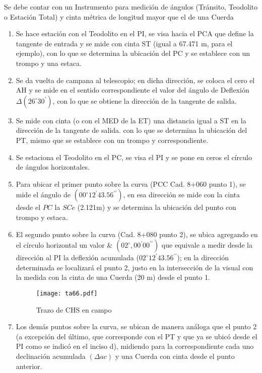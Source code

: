 Se debe contar con un Instrumento para medición de ángulos (Tránsito, Teodolito o Estación Total) y cinta métrica de longitud mayor que el de una Cuerda
\begin{enumerate}
    \item Se hace estación con el Teodolito en el PI, se visa hacia el PCA que define la tangente de entrada y se mide con cinta ST (igual a 67.471 m, para el ejemplo), con lo que se determina la ubicación del PC y se establece con un trompo y una estaca.
    \item Se da vuelta de campana al telescopio; en dicha dirección, se coloca el cero el AH y se mide en el sentido correspondiente el valor del ángulo de Deflexión $\Delta(26^{\circ} 30^{\prime})$, con lo que se obtiene la dirección de la tangente de salida.
    \item Se mide con cinta (o con el MED de la ET) una distancia igual a ST en la dirección de la tangente de salida. con lo que se determina la ubicación del PT, mismo que se establece con un trompo y correspondiente. 
    \item Se estaciona el Teodolito en el PC, se visa el PI y se pone en ceros el círculo de ángulos horizontales.
    \item Para ubicar el primer punto sobre la curva (PCC Cad. 8+060 punto 1), se mide el ángulo de $(00^{\circ} 12^{\prime} 43.56^{\prime\prime})$, en esa dirección se mide con la cinta desde el $PC$ la $SCe$ (2.121m) y se determina la ubicación del punto con trompo y estaca.
    \item El segundo punto sobre la curva (Cad. 8+080 punto 2), se ubica agregando en el círculo horizontal un valor \& $(02^{\circ}, 00^{\prime} 00^{\prime\prime})$ que equivale a medir desde la dirección al PI la deflexión acumulada ($02^{\circ} 12^{\prime} 43.56^{\prime\prime}$); en la dirección determinada se localizará el punto 2, justo en la intersección de la visual con la medida con la cinta de una Cuerda (20 m) desde el punto 1.
    \begin{figure}[h!]
    \centering
      \texttt{[image: ta66.pdf]}
      \caption{Trazo de CHS en campo}
      \label{ta66}
    \end{figure}
    
    \item Los demás puntos sobre la curva, se ubican de manera análoga que el punto 2 (a excepción del último, que corresponde con el PT y que ya se ubicó desde el PI como se indicó en el inciso d), midiendo para la correspondiente cada uno declinación acumulada $(\Delta ac)$ y una Cuerda con cinta desde el punto anterior.
    

\end{enumerate}
